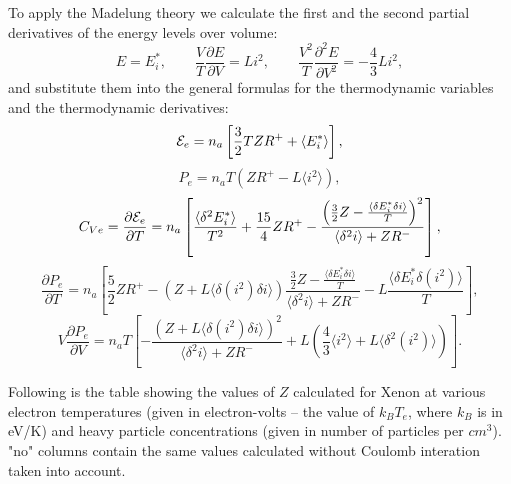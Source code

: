 To apply the Madelung theory we calculate the first and the second partial derivatives
of the energy levels over volume:
\begin{equation}
E = E^*_i, \qquad
\frac{V}{T} \frac{\partial E}{\partial V} = L i^2, \qquad
\frac{V^2}{T} \frac{\partial^2 E}{\partial V^2} = -\frac43 L i^2,
\end{equation}
and substitute them into the general formulas for the thermodynamic variables
and the thermodynamic derivatives:
\begin{equation}\label{madE}
{\cal E}_e = n_a\left[ \frac32 T Z R^+ + \langle E^*_i \rangle \right],
\end{equation}
\begin{equation}\label{madP}
P_e = n_aT ( ZR^+ - L \langle i^2 \rangle ),
\end{equation}
\begin{equation}\label{madCv}
C_{Ve}=\frac{\partial {\cal E}_e}{\partial T}=n_a\left[\frac{\langle\delta^2E^*_i\rangle}{T^2}+\frac{15}4ZR^+
-\frac{\left(\frac32Z-\frac{\langle\delta E^*_i\delta i\rangle}T\right)^2}{\langle\delta^2i\rangle+ZR^-}\right],
\end{equation}
\begin{equation}\label{madPT}
\frac {\partial P_e}{\partial T}=
n_a\left[
	\frac52 Z R^+ -
	(Z+L \langle \delta(i^2) \delta i \rangle)
		\frac{\frac32Z-\frac{\langle\delta E^*_i\delta i\rangle}T}{\langle\delta^2i\rangle+ZR^-} -
	L \frac{\langle \delta E^*_i \delta(i^2) \rangle}T
\right],
\end{equation}
\begin{equation}\label{madCompr}
V\frac{\partial P_e}{\partial V}=
n_a T \left[ -\frac{(Z + L \langle \delta(i^2) \delta i \rangle)^2}{\langle \delta^2 i \rangle + ZR^-} +
L \left( \frac43 \langle i^2 \rangle + L \langle \delta^2(i^2) \rangle \right) \right].
\end{equation}

Following is the table showing the values of $Z$ calculated for Xenon
at various electron temperatures
(given in electron-volts -- the value of $k_{B}T_{e}$, where $k_{B}$
is in eV/K) and heavy particle concentrations (given in number of
particles per $cm^{3}$). "no" columns contain the same values
calculated without Coulomb interation taken into account.

\begin{center}

\par\end{center}

